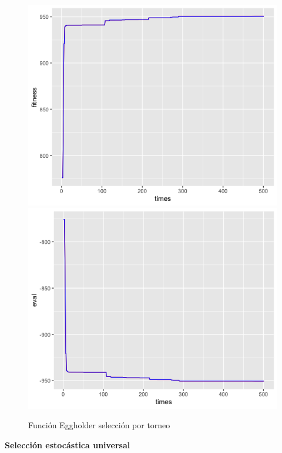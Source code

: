 \documentclass[letterpaper,12pt]{article}
\theoremstyle{definition}
\begin{document}
\begin{figure}[H]
    \includegraphics[width=\linewidth]{egg_tour_fitness}
  \endminipage\hfill
    \includegraphics[width=\linewidth]{egg_tour_eval}
  \endminipage\hfill
  \caption{Función Eggholder selección por torneo}
  \label{fig:egg_tour}
\end{figure}


\textbf{Selección estocástica universal}\\
\end{document}
